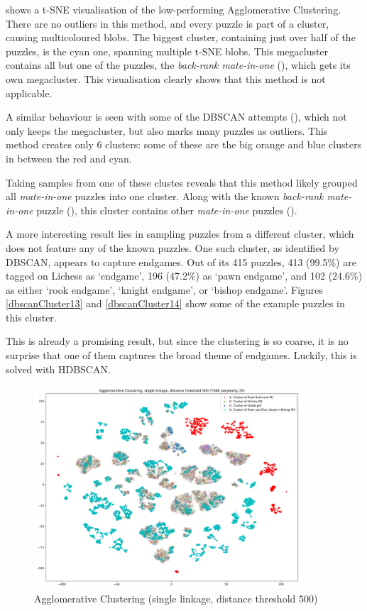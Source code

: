  shows a t-SNE visualisation of the low-performing Agglomerative
Clustering. There are no outliers in this method, and every puzzle is part of a
cluster, causing multicoloured blobs. The biggest cluster, containing just over
half of the puzzles, is the cyan one, spanning multiple t-SNE blobs. This
megacluster contains all but one of the puzzles, the \emph{back-rank
mate-in-one} (), which gets its own megacluster. This
visualisation clearly shows that this method is not applicable.

A similar behaviour is seen with some of the DBSCAN attempts (),
which not only keeps the megacluster, but also marks many puzzles as outliers.
This method creates only 6 clusters: some of these are the big orange and blue
clusters in between the red and cyan.

Taking samples from one of these clustes reveals that this method likely
grouped all \emph{mate-in-one} puzzles into one cluster. Along with the known
\emph{back-rank mate-in-one} puzzle (), this cluster contains
other \emph{mate-in-one} puzzles ().

A more interesting result lies in sampling puzzles from a different cluster,
which does not feature any of the known puzzles. One such cluster, as
identified by DBSCAN, appears to capture endgames. Out of its 415 puzzles, 413
(99.5\%) are tagged on Lichess as `endgame', 196 (47.2\%) as `pawn endgame',
and 102 (24.6\%) as either `rook endgame', `knight endgame', or `bishop
endgame'. Figures \ref{dbscanCluster13} and \ref{dbscanCluster14} show some of
the example puzzles in this cluster.

This is already a promising result, but since the clustering is so coarse, it
is no surprise that one of them captures the broad theme of endgames. Luckily,
this is solved with HDBSCAN.

\begin{figure}[H]
  \centering
  \includegraphics[width=0.9\textwidth]{project/img/tsne/ac_25.png}
  \caption{Agglomerative Clustering (single linkage, distance threshold $500$)}
  \label{tsne1}
\end{figure}

